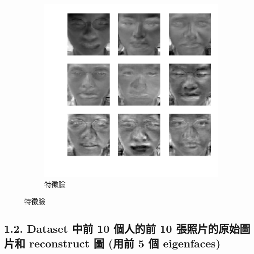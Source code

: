 \documentclass[fleqn,a4paper,12pt]{article}
\begin{document}
\begin{figure}[H]
\begin{subfigure}{.3\textwidth}
  \includegraphics[width=\linewidth]{problem1/eigen-faces.png}
  \caption{特徵臉}
  \label{fig:sub2}
\end{subfigure}
\label{fig:p1.1}
\end{figure}

\subsection*{1.2. Dataset 中前 10 個人的前 10 張照片的原始圖片和 reconstruct 圖 (用前 5 個 eigenfaces)}
\end{document}
